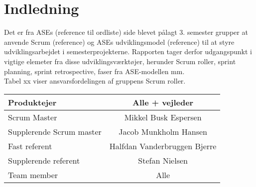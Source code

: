 \chapter*{Indledning}
Det er fra ASEs (reference til ordliste) side blevet pålagt 3. semester grupper at anvende Scrum (reference) og ASEs udviklingsmodel (reference) til at styre udviklingsarbejdet i semesterprojekterne. Rapporten tager derfor udgangspunkt i vigtige elemeter fra disse udviklingsværktøjer, herunder Scrum roller, sprint planning, sprint retrospective, faser fra ASE-modellen mm.\\

Tabel xx viser ansvarsfordelingen af gruppens Scrum roller. \\

\begin{tabular}{| l | c |}
\hline
Produktejer & Alle + vejleder\\\hline
Scrum Master & Mikkel Busk Espersen\\\hline
Supplerende Scrum master & Jacob Munkholm Hansen\\\hline
Fast referent & Halfdan Vanderbruggen Bjerre\\\hline
Supplerende referent & Stefan Nielsen\\\hline
Team member & Alle\\\hline
\end{tabular}
